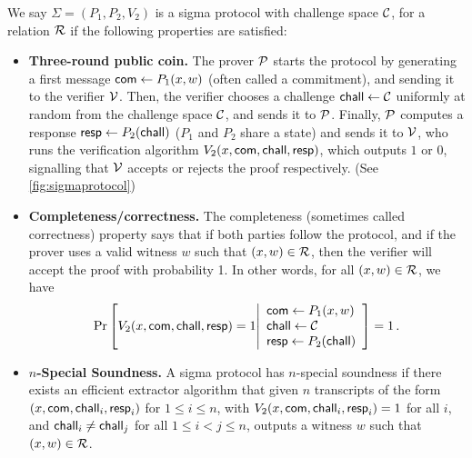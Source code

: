 \begin{definition} \label{def:sigmaprot}
We say $\Sigma = (P_1,P_2,V_2)$ is a sigma protocol with challenge space $\mathcal{C}$, for a relation $\mathcal{R}$ if the following properties are satisfied:

\begin{itemize}
    \item {\bf Three-round public coin.} The prover $\mathcal{P}$ starts the protocol by generating a first message $\mathsf{com} \gets P_1(x,w)$ (often called a commitment), and sending it to the verifier $\mathcal{V}$. Then, the verifier chooses a challenge $\mathsf{chall} \gets \mathcal{C}$ uniformly at random from the challenge space $\mathcal{C}$, and sends it to $\mathcal{P}$. Finally, $\mathcal{P}$ computes a response $\mathsf{resp} \gets P_2(\mathsf{chall})$ ($P_1$ and $P_2$ share a state) and sends it to $\mathcal{V}$, who runs the verification algorithm $V_2(x,\mathsf{com},\mathsf{chall},\mathsf{resp})$, which outputs $1$ or $0$, signalling that $\mathcal{V}$ accepts or rejects the proof respectively. (See \cref{fig:sigmaprotocol})
    
    \item {\bf Completeness/correctness.} The completeness (sometimes called correctness) property says that if both parties follow the protocol, and if the prover uses a valid witness $w$ such that $(x,w) \in \mathcal{R}$, then the verifier will accept the proof with probability 1. In other words, for all $(x,w) \in \mathcal{R}$, we have \[
\Pr \left[ V_2(x,\mathsf{com},\mathsf{chall},\mathsf{resp}) = 1 \middle| \begin{array}{l} \mathsf{com} \gets P_1(x,w) \\ \mathsf{chall} \gets \mathcal{C} \\ \mathsf{resp} \gets P_2(\mathsf{chall}) \end{array} \right] = 1 \, . 
\]

    \item {\bf $n$-Special Soundness.} A sigma protocol has $n$-special soundness if there exists an efficient extractor algorithm that given $n$ transcripts of the form $(x,\mathsf{com},\mathsf{chall}_i,\mathsf{resp}_i)$ for $1 \le i \le n$, with $V_2(x,\mathsf{com},\mathsf{chall}_i,\mathsf{resp}_i) =  1$ for all $i$, and $\mathsf{chall}_i \neq \mathsf{chall}_j$ for all $1 \le i < j \le n$, outputs a witness $w$ such that $(x,w) \in \mathcal{R}$. 
    

\end{itemize}
\end{definition}

